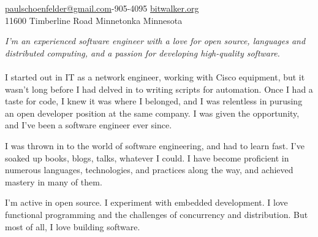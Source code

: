 \documentclass[10pt,a4paper]{article}
\begin{document}
\sloppy  %



\nobreakvspace{0.3em}  %

\noindent\href{mailto:paulschoenfelder@gmail.com}{paulschoenfelder\mbox{}@\mbox{}gmail.com}-905-4095\sbull
\href{http://bitwalker.org}{bitwalker.org}
\\
11600 Timberline Road\sbull
Minnetonka\sbull
Minnesota

\spacedhrule{0.9em}{-0.4em}  %


\vspace{-1.3em}  %
\begin{multicols}{2}  %
\noindent \emph{I'm an experienced software engineer with a love for open source, languages and distributed computing, and a passion for developing high-quality software.}
\\
\\
I started out in IT as a network engineer, working with Cisco equipment, but it wasn't long before I had delved in to writing scripts for automation. Once I had a taste for code, I knew it was where I belonged, and I was relentless in purusing an open developer position at the same company. I was given the opportunity, and I've been a software engineer ever since.

I was thrown in to the world of software engineering, and had to learn fast. I've soaked up books, blogs, talks, whatever I could. I have become proficient in numerous languages, technologies, and practices along the way, and achieved mastery in many of them.

I'm active in open source. I experiment with embedded development. I love functional programming and the challenges of concurrency and distribution. But most of all, I love building software.
\end{multicols}


\spacedhrule{0em}{-0.4em}
\end{document}
